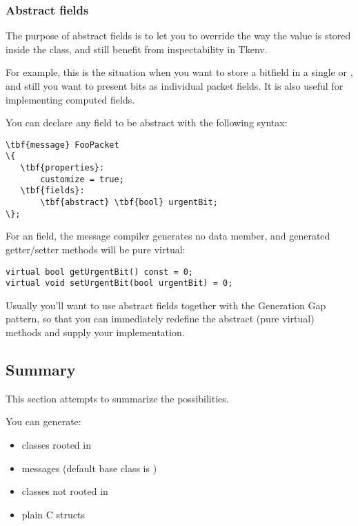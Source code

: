 \subsubsection{Abstract fields}

The purpose of abstract fields is to let you to override
the way the value is stored inside the class,
and still benefit from inspectability in Tkenv.

For example, this is the situation when you want to store a bitfield
in a single  or , and still you want
to present bits as individual packet fields.
It is also useful for implementing computed fields.

You can declare any field to be abstract with the following syntax:

%
%
\begin{Verbatim}[commandchars=\\\{\}]
\tbf{message} FooPacket
\{
   \tbf{properties}:
       customize = true;
   \tbf{fields}:
       \tbf{abstract} \tbf{bool} urgentBit;
\};
\end{Verbatim}

For an  field, the message compiler generates
no data member, and generated getter/setter methods will be pure
virtual:

\begin{verbatim}
virtual bool getUrgentBit() const = 0;
virtual void setUrgentBit(bool urgentBit) = 0;
\end{verbatim}


Usually you'll want to use abstract fields together with
the Generation Gap pattern, so that you can immediately
redefine the abstract (pure virtual) methods and
supply your implementation.


\subsection{Summary}

This section attempts to summarize the possibilities.

You can generate:

\begin{itemize}
  \item  classes rooted in 
  \item  messages (default base class is )
  \item  classes not rooted in 
  \item  plain C structs
\end{itemize}

